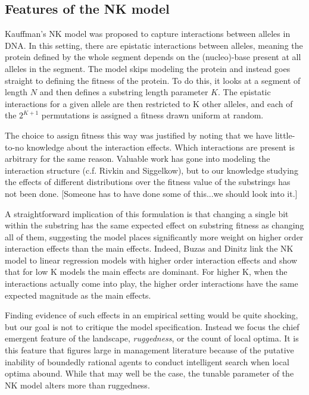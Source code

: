 \documentclass[12pt]{article}
\begin{document}
\maketitle

\subsection*{Features of the NK model}

Kauffman's NK model was proposed to capture interactions between alleles in DNA. In this setting, there are epistatic interactions between alleles, meaning the protein defined by the whole segment depends on the (nucleo)-base present at all alleles in the segment. The model skips modeling the protein and instead goes straight to defining the fitness of the protein. To do this, it looks at a segment of length $N$ and then defines a substring length parameter $K$. The epistatic interactions for a given allele are then restricted to K other alleles, and each of the $2^{K+1}$ permutations is assigned a fitness drawn uniform at random.

The choice to assign fitness this way was justified by noting that we have little-to-no knowledge about the interaction effects. Which interactions are present is arbitrary for the same reason. Valuable work has gone into modeling the interaction structure (c.f. Rivkin and Siggelkow), but to our knowledge studying the effects of different distributions over the fitness value of the substrings has not been done. [Someone has to have done some of this...we should look into it.]

A straightforward implication of this formulation is that changing a single bit within the substring has the same expected effect on substring fitness as changing all of them, suggesting the model places significantly more weight on higher order interaction effects than the main effects. Indeed, Buzas and Dinitz link the NK model to linear regression models with higher order interaction effects and show that for low K models the main effects are dominant. For higher K, when the interactions actually come into play, the higher order interactions have the same expected magnitude as the main effects.

Finding evidence of such effects in an empirical setting would be quite shocking, but our goal is not to critique the model specification. Instead we focus the chief emergent feature of the landscape, \textit{ruggedness}, or the count of local optima. It is this feature that figures large in management literature because of the putative inability of boundedly rational agents to conduct intelligent search when local optima abound. While that may well be the case, the tunable parameter of the NK model alters more than ruggedness.
\end{document}
